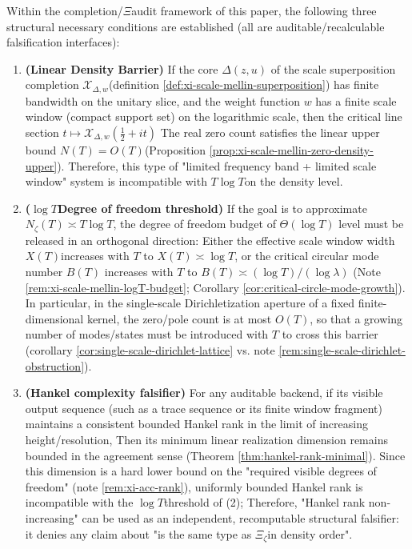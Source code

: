 \begin{theorem}\label{thm:xi-zero-statistics-log-budget-lower-bound}
Within the completion/\(\Xi\) ​​audit framework of this paper, the following three structural necessary conditions are established (all are auditable/recalculable falsification interfaces):
\begin{enumerate}
  \item ​​\textbf{(Linear Density Barrier)}
  If the core \(\Delta(z,u)\) of the scale superposition completion \(\mathcal X_{\Delta,w}\) ​​(definition \ref{def:xi-scale-mellin-superposition}) has finite bandwidth on the unitary slice, and the weight function \(w\) has a finite scale window (compact support set) on the logarithmic scale, then the critical line section
  \(t\mapsto \mathcal X_{\Delta,w}(\tfrac12+it)\)
  The real zero count satisfies the linear upper bound \(N(T)=O(T)\) ​​(Proposition \ref{prop:xi-scale-mellin-zero-density-upper}).
  Therefore, this type of "limited frequency band + limited scale window" system is incompatible with \(T\log T\) ​​on the density level.

  \item \textbf{(\(\log T\) ​​Degree of freedom threshold)}
  If the goal is to approximate \(N_\zeta(T)\asymp T\log T\), the degree of freedom budget of \(\Theta(\log T)\) level must be released in an orthogonal direction:
  Either the effective scale window width \(X(T)\) ​​increases with \(T\) to \(X(T)\asymp \log T\), or the critical circular mode number \(B(T)\) increases with \(T\) to \(B(T)\asymp (\log T)/(\log\lambda)\)
  (Note \ref{rem:xi-scale-mellin-logT-budget}; Corollary \ref{cor:critical-circle-mode-growth}).
  In particular, in the single-scale Dirichletization aperture of a fixed finite-dimensional kernel, the zero/pole count is at most \(O(T)\), so that a growing number of modes/states must be introduced with \(T\) to cross this barrier (corollary \ref{cor:single-scale-dirichlet-lattice} vs. note \ref{rem:single-scale-dirichlet-obstruction}).

  \item ​​\textbf{(Hankel complexity falsifier)}
  For any auditable backend, if its visible output sequence (such as a trace sequence or its finite window fragment) maintains a consistent bounded Hankel rank in the limit of increasing height/resolution,
  Then its minimum linear realization dimension remains bounded in the agreement sense (Theorem \ref{thm:hankel-rank-minimal}).
  Since this dimension is a hard lower bound on the "required visible degrees of freedom" (note \ref{rem:xi-acc-rank}), uniformly bounded Hankel rank is incompatible with the \(\log T\) ​​threshold of (2);
  Therefore, "Hankel rank non-increasing" can be used as an independent, recomputable structural falsifier: it denies any claim about "is the same type as \(\Xi_\zeta\) ​​in density order".
\end{enumerate}
\end{theorem}

